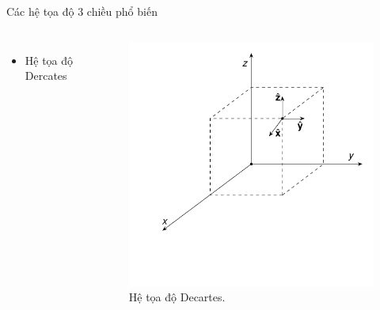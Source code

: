 \begin{frame}{Các hệ tọa độ 3 chiều phổ biến}
    \vspace{-4mm}
    \begin{columns}
        \begin{itemize}
            \item Hệ tọa độ Dercates
        \end{itemize}
        \begin{figure}
            \centering
            \includegraphics[width=\linewidth]{Figures/Decartes_coordinate.pdf}
            \caption{Hệ tọa độ Decartes.}
            \label{fig:Decartes_coordinate}
        \end{figure}


\end{columns}
\end{frame}
